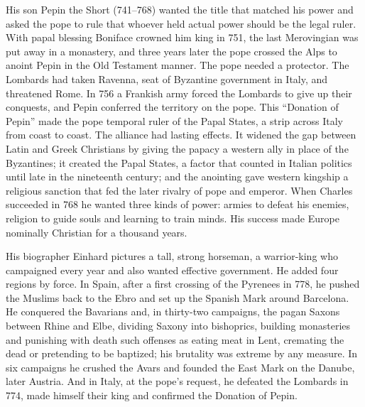 His son Pepin the Short (741--768) wanted the title that matched his power and asked the pope to rule
that whoever held actual power should be the legal ruler. With papal blessing Boniface crowned him
king in 751, the last Merovingian was put away in a monastery, and three years later the pope crossed
the Alps to anoint Pepin in the Old Testament manner. The pope needed a protector. The Lombards had
taken Ravenna, seat of Byzantine government in Italy, and threatened Rome. In 756 a Frankish army
forced the Lombards to give up their conquests, and Pepin conferred the territory on the pope. This
``Donation of Pepin'' made the pope temporal ruler of the Papal States, a strip across Italy from
coast to coast. The alliance had lasting effects. It widened the gap between Latin and Greek Christians by giving the papacy a western ally in place of the Byzantines; it created the Papal
States, a factor that counted in Italian politics until late in the nineteenth century; and the anointing gave western
kingship a religious sanction that fed the later rivalry of pope and emperor. When Charles succeeded
in 768 he wanted three kinds of power: armies to defeat his enemies, religion to guide souls and learning to train minds. His success made Europe nominally Christian for a thousand
years.

His biographer Einhard pictures a tall, strong horseman, a warrior-king who campaigned every year and
also wanted effective government. He added four regions by force. In Spain, after a first crossing of
the Pyrenees in 778, he pushed the Muslims back to the Ebro and set up the Spanish Mark around
Barcelona. He conquered the Bavarians and, in thirty-two campaigns, the pagan Saxons between Rhine
and Elbe, dividing Saxony into bishoprics, building monasteries and punishing with death such
offenses as eating meat in Lent, cremating the dead or pretending to be baptized; his brutality was
extreme by any measure. In six campaigns he crushed the Avars and founded the East Mark on the Danube,
later Austria. And in Italy, at the pope's request, he defeated the Lombards in 774, made himself
their king and confirmed the Donation of Pepin.

